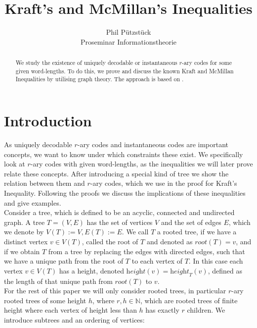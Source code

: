 \documentclass[12pt]{article}
\newcommand{\he}[0]{\textit{height}}
\newcommand{\ro}[0]{\textit{root}}
\begin{document}
\title{Kraft's and McMillan's Inequalities}
\author{Phil Pützstück\\
Proseminar Informationstheorie}
\maketitle

\begin{abstract}
    We study the existence of uniquely decodable or instantaneous $r$-ary codes for some given word-lengths.
    To do this, we prove and discuss the known Kraft and McMillan Inequalities by utilising graph theory.
    The approach is based on \cite{ICT}.
\end{abstract}
\section*{Introduction}
As uniquely decodable $r$-ary codes and instantaneous codes are important concepts, we want to know under which
constraints these exist. We specifically look at $r$-ary codes with given word-lengths, as the inequalities
we will later prove relate these concepts. After introducing a special kind of tree we show the relation between them and $r$-ary codes, which we use in the proof for Kraft's Inequality. Following the proofs we discuss the implications of these inequalities and give examples.\\[10pt]
Consider a tree, which is defined to be an acyclic, connected and undirected graph.
A tree $T = (V,E)$ has the set of vertices $V$ and the set of edges $E$, which we denote by $V(T) := V, E(T) := E$.
We call $T$ a rooted tree, if we have a distinct vertex $v \in V(T)$, called the root of $T$ and denoted as
$\ro(T) = v$, and if we obtain $T$ from a tree by replacing the edges with directed edges, such that we have a unique path from the root of $T$ to each vertex of $T$.
In this case each vertex $v \in V(T)$ has a height, denoted $\he(v) = \he_T(v)$,
defined as the length of that unique path from $\ro(T)$ to $v$.\\[10pt]
For the rest of this paper we will only consider rooted trees, in particular $r$-ary rooted trees of some height $h$, where $r,h \in \mathbb{N}$, which
are rooted trees of finite height where each vertex of height less than $h$ has exactly $r$ children.
We introduce subtrees and an ordering of vertices:
\end{document}
